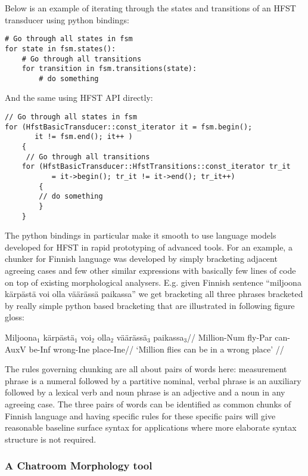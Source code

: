\documentclass{llncs}
\begin{document}
Below is an example of iterating through the states and transitions of
an HFST transducer using python bindings:

\begin{verbatim}
# Go through all states in fsm       
for state in fsm.states():
    # Go through all transitions                                               
    for transition in fsm.transitions(state):
        # do something
\end{verbatim}

And the same using HFST API directly:

\begin{verbatim}
// Go through all states in fsm
for (HfstBasicTransducer::const_iterator it = fsm.begin();
       it != fsm.end(); it++ )      
    {      
     // Go through all transitions    
    for (HfstBasicTransducer::HfstTransitions::const_iterator tr_it  
           = it->begin(); tr_it != it->end(); tr_it++) 
        {
        // do something
        }
    }
\end{verbatim}

The python bindings in particular make it smooth to use language models
developed for HFST in rapid prototyping of advanced tools. For an example, a
chunker for Finnish language was developed by simply bracketing adjacent
agreeing cases and few other similar expressions with basically few lines of
code on top of existing morphological analysers. E.g.  given Finnish sentence
``miljoona kärpästä voi olla väärässä paikassa'' we get bracketing all three
phrases bracketed by really simple python based bracketing that are illustrated
in following figure gloss:

\ex
\begingl
\gla Miljoona$_1$ kärpästä$_1$ voi$_2$ olla$_2$ väärässä$_3$ paikassa$_3$//
\glb Million-{\sc Num} fly-{\sc Par} can-{\sc AuxV} be-{\sc Inf} wrong-{\sc Ine} place-{\sc Ine}//
\glft `Million flies can be in a wrong place' //
\endgl
\xe

The rules governing chunking are all about pairs of words here: measurement
phrase is a numeral followed by a partitive nominal, verbal phrase is an
auxiliary followed by a lexical verb and noun phrase is an adjective and a noun
in any agreeing case.  The three pairs of words can be identified as common
chunks of Finnish language and having specific rules for these specific pairs
will give reasonable baseline surface syntax for applications where more
elaborate syntax structure is not required.

\subsubsection{A Chatroom Morphology tool}
\end{document}
